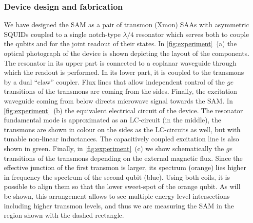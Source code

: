\documentclass[%
 aip,
 amsmath,amssymb,
 reprint,%
]{revtex4-1}
\begin{document}
\subsubsection{Device design and fabrication}
We have designed the SAM as a pair of transmon (Xmon\cite{barends2013coherent}) SAAs with asymmetric SQUIDs\cite{hutchings2017tunable} coupled to a single notch-type\cite{probst2015efficient} $\lambda/4$ resonator which serves both to couple\cite{majer2007coupling} the qubits and for the joint\cite{chow2010detecting} readout of their states. In \autoref{fig:experiment}~(a) the optical photograph of the device is shown depicting the layout of the components. The resonator in its upper part is connected to a coplanar waveguide through which the readout is performed. In its lower part, it is coupled to the transmons by a dual ``claw''\cite{barends2013coherent} coupler. Flux lines that allow independent control of the $ge$ transitions of the transmons are coming from the sides. Finally, the excitation waveguide coming from below directs microwave signal towards the SAM. In \autoref{fig:experiment}~(b) the equivalent electrical circuit of the device. The resonator fundamental mode is approximated as an LC-circuit (in the middle), the transmons are shown in colour on the sides as the LC-circuits as well, but with tunable non-linear inductances. The capacitively coupled excitation line is also shown in green. Finally, in \autoref{fig:experiment}~(c) we show schematically the $ge$ transitions of the transmons depending on the external magnetic flux. Since the effective junction of the first transmon is larger, its spectrum (orange) lies higher in frequency the spectrum of the second qubit (blue). Using both coils, it is possible to align them so that the lower sweet-spot of the orange qubit. As will be shown, this arrangement allows to see multiple energy level intersections including higher transmon levels, and thus we are measuring the SAM in the region shown with the dashed rectangle.
\end{document}
